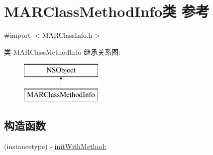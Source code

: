 \hypertarget{interface_m_a_r_class_method_info}{}\section{M\+A\+R\+Class\+Method\+Info类 参考}
\label{interface_m_a_r_class_method_info}


{\ttfamily \#import $<$M\+A\+R\+Class\+Info.\+h$>$}

类 M\+A\+R\+Class\+Method\+Info 继承关系图\+:\begin{figure}[H]
\begin{center}
\leavevmode
\includegraphics[height=2.000000cm]{interface_m_a_r_class_method_info}
\end{center}
\end{figure}
\subsection*{构造函数}
\begin{DoxyCompactItemize}
\item 
(instancetype) -\/ \hyperlink{interface_m_a_r_class_method_info_a691a3294f72bff4df6a3fc75f7c37e50}{init\+With\+Method\+:}
\end{DoxyCompactItemize}
